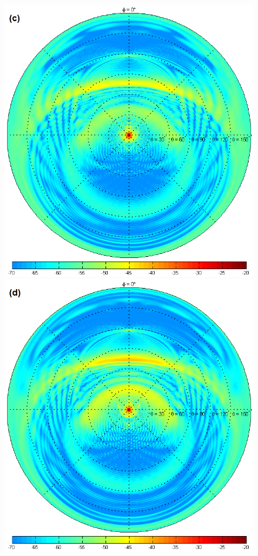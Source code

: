\documentclass{aa}
\begin{document}
\begin{figure}
  \includegraphics[width=\columnwidth]{TS3e15h_full}\hfill%
  \includegraphics[width=\columnwidth]{TU3e20h_full}

\end{figure}
\end{document}
